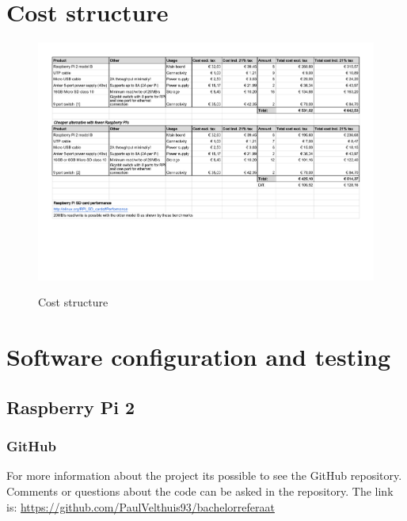 \documentclass{sig-alternate-br}
\begin{document}
\section{Cost structure}\label{sec:cost}
\begin{figure}[H]
	\includegraphics[scale=0.65]{Kostenoverzicht_cluster.pdf}
	\label{fig:cost}
	\caption{Cost structure}
\end{figure}


\section{Software configuration and testing}\label{sec:software}

\subsection{Raspberry Pi 2}

\subsubsection{GitHub}
For more information about the project its possible to see the GitHub repository. Comments or questions about the code can be asked in the repository. \newline
The link is: \newline
\url{https://github.com/PaulVelthuis93/bachelorreferaat}
\end{document}
